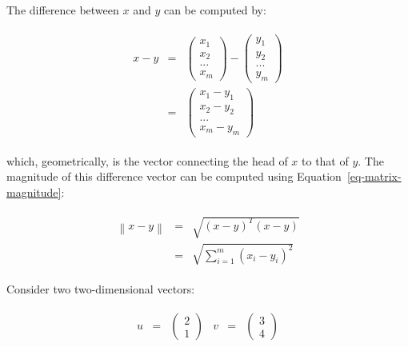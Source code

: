\documentclass[
  letterpaper,
]{scrbook}
\begin{document}
The difference between \(x\) and \(y\) can be computed by:

\[\begin{aligned}
  \begin{matrix}
x - y & = &
  \begin{pmatrix}
    x_1 \\
    x_2 \\
    ... \\
    x_m
  \end{pmatrix}
  -
  \begin{pmatrix}
    y_1 \\
    y_2 \\
    ... \\
    y_m
  \end{pmatrix}\\
  & = &
  \begin{pmatrix}
    x_1 - y_1 \\
    x_2 - y_2 \\
    ... \\
    x_m - y_m
  \end{pmatrix}
\end{matrix}
\end{aligned}\]

which, geometrically, is the vector connecting the head of \(x\) to that
of \(y\). The magnitude of this difference vector can be computed using
Equation~\hyperref[eq-matrix-magnitude]{{[}eq-matrix-magnitude{]}}:

\[\begin{aligned}
  \begin{matrix}
    \left\lVert x - y \right\rVert & = & \sqrt{(x-y)^T(x-y)} \\
      & = & \sqrt{\sum_{i=1}^{m} (x_i-y_i)^2}
    \end{matrix}
\end{aligned}\]

Consider two two-dimensional vectors:

\[\begin{aligned}
  \begin{matrix}
    u & = &
      \begin{pmatrix}
        2 \\ 1
      \end{pmatrix}
    &
    v & = &
      \begin{pmatrix}
        3 \\ 4
      \end{pmatrix}
  \end{matrix}
\end{aligned}\]
\end{document}
